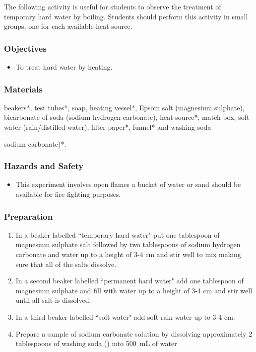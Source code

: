 The following activity is useful for students to observe the treatment of temporary hard water by boiling. Students should perform this activity in small groups, one for each available heat source.

\subsubsection*{Objectives}
\begin{itemize}
\item{To treat hard water by heating.}
\end{itemize}

\subsubsection*{Materials}
beakers*, test tubes*, soap, heating vessel*, Epsom salt (magnesium sulphate), bicarbonate of soda (sodium hydrogen carbonate), heat source*, match box, soft water (rain/distilled water), filter paper*, funnel* and washing soda {sodium carbonate)*.

\subsubsection*{Hazards and Safety}
\begin{itemize}
\item{This experiment involves open flames a bucket of water or sand should be available for fire fighting purposes.}
\end{itemize}

\subsubsection*{Preparation}
\begin{enumerate}
\item{In a beaker labelled ``temporary hard water" put one tablespoon of magnesium sulphate salt followed by two tablespoons  of sodium hydrogen carbonate and water up to a height of 3-4 cm and stir well to mix making sure that all of the salts dissolve.}
\item{In a second beaker labelled ``permanent hard water" add one tablespoon of magnesium sulphate and fill with water up to a height of 3-4 cm and stir well until all salt is dissolved.}
\item{In a third beaker labelled ``soft water"  add soft rain water up to 3-4 cm.}
\item{Prepare a sample of sodium carbonate solution by dissolving approximately 2 tablespoons of washing soda () into 500~mL of water}
\end{enumerate}

}
